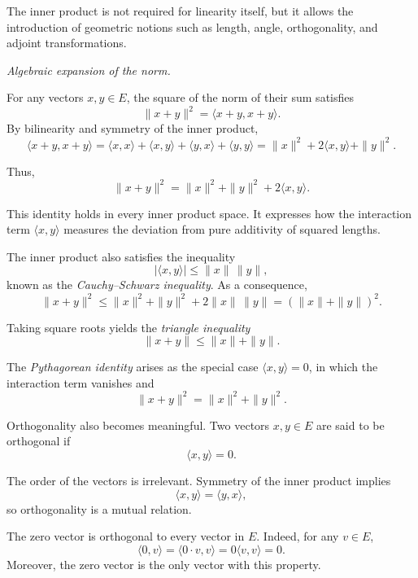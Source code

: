The inner product is not required for linearity itself, but it allows the
introduction of geometric notions such as length, angle, orthogonality, and
adjoint transformations.

\medskip

\textit{Algebraic expansion of the norm.}

For any vectors $x,y \in E$, the square of the norm of their sum satisfies
\[
\|x+y\|^2
=
\langle x+y, x+y \rangle.
\]
By bilinearity and symmetry of the inner product,
\[
\langle x+y, x+y \rangle
=
\langle x,x \rangle
+
\langle x,y \rangle
+
\langle y,x \rangle
+
\langle y,y \rangle
=
\|x\|^2
+
2\langle x,y \rangle
+
\|y\|^2.
\]

Thus,
\[
\|x+y\|^2
=
\|x\|^2
+
\|y\|^2
+
2\langle x,y \rangle.
\]

This identity holds in every inner product space.
It expresses how the interaction term $\langle x,y \rangle$ measures the
deviation from pure additivity of squared lengths.

\medskip

The inner product also satisfies the inequality
\[
|\langle x,y \rangle|
\le
\|x\|\,\|y\|,
\]
known as the \emph{Cauchy--Schwarz inequality}.
As a consequence,
\[
\|x+y\|^2
\le
\|x\|^2
+
\|y\|^2
+
2\|x\|\,\|y\|
=
(\|x\|+\|y\|)^2.
\]

Taking square roots yields the \emph{triangle inequality}
\[
\|x+y\|
\le
\|x\|
+
\|y\|.
\]

\medskip

The \textit{Pythagorean identity} arises as the special case
$\langle x,y \rangle = 0$,
in which the interaction term vanishes and
\[
\|x+y\|^2
=
\|x\|^2
+
\|y\|^2.
\]

\medskip

Orthogonality also becomes meaningful.
Two vectors $x,y \in E$ are said to be orthogonal if
\[
\langle x,y \rangle = 0.
\]

\medskip

The order of the vectors is irrelevant.
Symmetry of the inner product implies
\[
\langle x,y \rangle = \langle y,x \rangle,
\]
so orthogonality is a mutual relation.

\medskip

The zero vector is orthogonal to every vector in $E$.
Indeed, for any $v \in E$,
\[
\langle 0,v \rangle
=
\langle 0\cdot v, v \rangle
=
0\langle v,v \rangle
=
0.
\]
Moreover, the zero vector is the only vector with this property.

\medskip


